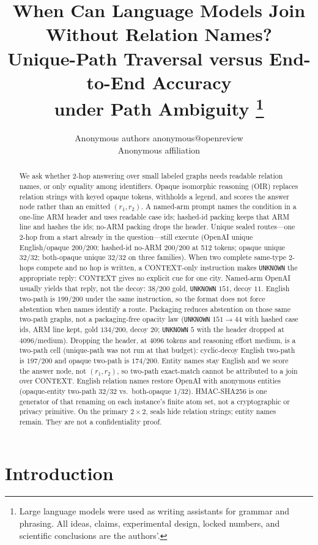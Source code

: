 \documentclass[10pt]{article} %
\title{When Can Language Models Join\\
Without Relation Names?\\
Unique-Path Traversal versus End-to-End Accuracy\\
under Path Ambiguity%
\thanks{Large language models were used as writing assistants for grammar
and phrasing. All ideas, claims, experimental design, locked numbers, and
scientific conclusions are the authors'.}}
\author{\name Anonymous authors \email anonymous@openreview \\
 \addr Anonymous affiliation}
\begin{document}
\maketitle

\begin{abstract}
We ask whether 2-hop answering over small labeled graphs needs readable
relation names, or only equality among identifiers.
Opaque isomorphic reasoning (OIR) replaces relation strings with keyed
opaque tokens, withholds a legend, and scores the answer node rather than
an emitted $(r_1,r_2)$.
A named-arm prompt names the condition in a one-line ARM header and uses
readable case ids; hashed-id packing keeps that ARM line and hashes the
ids; no-ARM packing drops the header.
Unique sealed routes---one 2-hop from a start already in the
question---still execute
(OpenAI unique English/opaque $200/200$;
hashed-id no-ARM $200/200$ at 512 tokens;
opaque unique $32/32$;
both-opaque unique $32/32$ on three families).
When two complete same-type 2-hops compete and no hop is written, a
CONTEXT-only instruction makes \texttt{UNKNOWN} the appropriate reply:
CONTEXT gives no explicit cue for one city.
Named-arm OpenAI usually yields that reply, not the decoy: $38/200$ gold,
\texttt{UNKNOWN} $151$, decoy $11$.
English two-path is $199/200$ under the same instruction, so the format
does not force abstention when names identify a route.
Packaging reduces abstention on those same two-path graphs, not a
packaging-free opacity law
(\texttt{UNKNOWN} $151\to 44$ with hashed case ids, ARM line kept,
gold $134/200$, decoy $20$;
\texttt{UNKNOWN} $5$ with the header dropped at 4096/medium).
Dropping the header, at 4096 tokens and reasoning effort medium, is a
two-path cell (unique-path was not run at that budget):
cyclic-decoy English two-path is $197/200$ and opaque two-path is
$174/200$.
Entity names stay English and we score the answer node, not $(r_1,r_2)$,
so two-path exact-match cannot be attributed to a join over CONTEXT.
English relation names restore OpenAI with anonymous entities
(opaque-entity two-path $32/32$ vs.\ both-opaque $1/32$).
HMAC-SHA256 is one generator of that renaming on each instance's finite
atom set, not a cryptographic or privacy primitive.
On the primary $2{\times}2$, seals hide relation strings; entity names
remain. They are not a confidentiality proof.
\end{abstract}

\section{Introduction}
\end{document}
